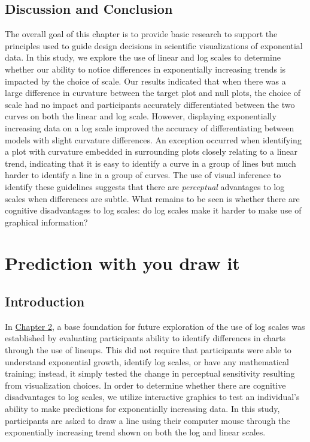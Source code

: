 \documentclass[print]{nuthesis}
\begin{document}
\hypertarget{discussion-and-conclusion}{%
\section{Discussion and Conclusion}\label{discussion-and-conclusion}}

The overall goal of this chapter is to provide basic research to support the principles used to guide design decisions in scientific visualizations of exponential data.
In this study, we explore the use of linear and log scales to determine whether our ability to notice differences in exponentially increasing trends is impacted by the choice of scale.
Our results indicated that when there was a large difference in curvature between the target plot and null plots, the choice of scale had no impact and participants accurately differentiated between the two curves on both the linear and log scale.
However, displaying exponentially increasing data on a log scale improved the accuracy of differentiating between models with slight curvature differences.
An exception occurred when identifying a plot with curvature embedded in surrounding plots closely relating to a linear trend, indicating that it is easy to identify a curve in a group of lines but much harder to identify a line in a group of curves.
The use of visual inference to identify these guidelines suggests that there are \emph{perceptual} advantages to log scales when differences are subtle.
What remains to be seen is whether there are cognitive disadvantages to log scales: do log scales make it harder to make use of graphical information?

\hypertarget{youdrawit}{%
\chapter{Prediction with you draw it}\label{youdrawit}}

\hypertarget{introduction-1}{%
\section{Introduction}\label{introduction-1}}

In \protect\hyperlink{lineups}{Chapter 2}, a base foundation for future exploration of the use of log scales was established by evaluating participants ability to identify differences in charts through the use of lineups.
This did not require that participants were able to understand exponential growth, identify log scales, or have any mathematical training; instead, it simply tested the change in perceptual sensitivity resulting from visualization choices.
In order to determine whether there are cognitive disadvantages to log scales, we utilize interactive graphics to test an individual's ability to make predictions for exponentially increasing data. In this study, participants are asked to draw a line using their computer mouse through the exponentially increasing trend shown on both the log and linear scales.
\end{document}
